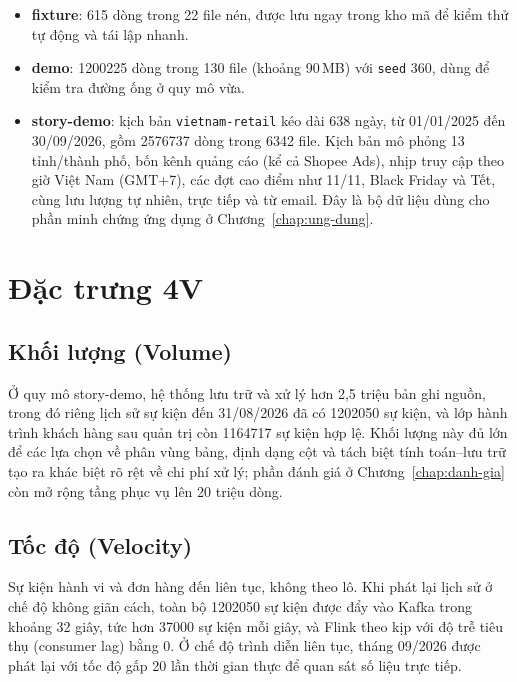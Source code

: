 \begin{itemize}
    \item \textbf{fixture}: \num{615} dòng trong 22 file nén, được lưu ngay trong kho mã để kiểm thử tự động và tái lập nhanh.
    \item \textbf{demo}: \num{1200225} dòng trong 130 file (khoảng 90\,MB) với \texttt{seed} 360, dùng để kiểm tra đường ống ở quy mô vừa.
    \item \textbf{story-demo}: kịch bản \texttt{vietnam-retail} kéo dài 638 ngày, từ 01/01/2025 đến 30/09/2026, gồm \num{2576737} dòng trong \num{6342} file. Kịch bản mô phỏng 13 tỉnh/thành phố, bốn kênh quảng cáo (kể cả Shopee Ads), nhịp truy cập theo giờ Việt Nam (GMT+7), các đợt cao điểm như 11/11, Black Friday và Tết, cùng lưu lượng tự nhiên, trực tiếp và từ email. Đây là bộ dữ liệu dùng cho phần minh chứng ứng dụng ở Chương~\ref{chap:ung-dung}.
\end{itemize}

\section{Đặc trưng 4V}
\label{sec:c2-4v}

\subsection{Khối lượng (Volume)}
\label{sec:c2-volume}
Ở quy mô story-demo, hệ thống lưu trữ và xử lý hơn 2,5 triệu bản ghi nguồn, trong đó riêng lịch sử sự kiện đến 31/08/2026 đã có \num{1202050} sự kiện, và lớp hành trình khách hàng sau quản trị còn \num{1164717} sự kiện hợp lệ. Khối lượng này đủ lớn để các lựa chọn về phân vùng bảng, định dạng cột và tách biệt tính toán--lưu trữ tạo ra khác biệt rõ rệt về chi phí xử lý; phần đánh giá ở Chương~\ref{chap:danh-gia} còn mở rộng tầng phục vụ lên 20 triệu dòng.

\subsection{Tốc độ (Velocity)}
\label{sec:c2-velocity}
Sự kiện hành vi và đơn hàng đến liên tục, không theo lô. Khi phát lại lịch sử ở chế độ không giãn cách, toàn bộ \num{1202050} sự kiện được đẩy vào Kafka trong khoảng 32 giây, tức hơn \num{37000} sự kiện mỗi giây, và Flink theo kịp với độ trễ tiêu thụ (consumer lag) bằng 0. Ở chế độ trình diễn liên tục, tháng 09/2026 được phát lại với tốc độ gấp 20 lần thời gian thực để quan sát số liệu trực tiếp.

